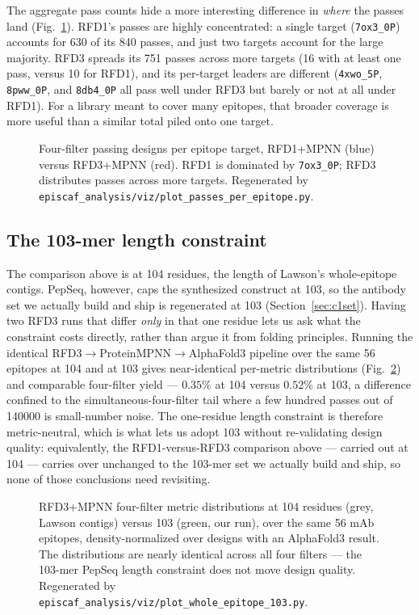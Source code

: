The aggregate pass counts hide a more interesting difference in \emph{where} the passes
land (Fig.~\ref{fig:passep}). RFD1's passes are highly concentrated: a single target
(\texttt{7ox3\_0P}) accounts for \num{630} of its \num{840} passes, and just two targets
account for the large majority. RFD3 spreads its \num{751} passes across more targets (16
with at least one pass, versus 10 for RFD1), and its per-target leaders are different
(\texttt{4xwo\_5P}, \texttt{8pww\_0P}, and \texttt{8db4\_0P} all pass well under RFD3 but
barely or not at all under RFD1). For a library meant to cover many epitopes, that broader
coverage is more useful than a similar total piled onto one target.

\begin{figure}[h]\centering
{}
\caption{Four-filter passing designs per epitope target, RFD1+MPNN (blue) versus RFD3+MPNN
(red). RFD1 is dominated by \texttt{7ox3\_0P}; RFD3 distributes passes across more targets.
Regenerated by \texttt{episcaf\_analysis/viz/plot\_passes\_per\_epitope.py}.}
\label{fig:passep}
\end{figure}

\subsection{The 103-mer length constraint}\label{sec:lenconstraint}
The comparison above is at \num{104} residues, the length of Lawson's whole-epitope contigs. PepSeq,
however, caps the synthesized construct at \num{103}, so the antibody set we actually build and ship is
regenerated at \num{103} (Section~\ref{sec:c1set}). Having two RFD3 runs that differ \emph{only} in that
one residue lets us ask what the constraint costs directly, rather than argue it from folding
principles. Running the identical RFD3$\rightarrow$ProteinMPNN$\rightarrow$AlphaFold3 pipeline over the
same \num{56} epitopes at \num{104} and at \num{103} gives near-identical per-metric distributions
(Fig.~\ref{fig:len}) and comparable four-filter yield --- $0.35\%$ at \num{104} versus $0.52\%$ at
\num{103}, a difference confined to the simultaneous-four-filter tail where a few hundred passes out of
\num{140000} is small-number noise. The one-residue length constraint is therefore metric-neutral, which
is what lets us adopt \num{103} without re-validating design quality: equivalently, the RFD1-versus-RFD3
comparison above --- carried out at \num{104} --- carries over unchanged to the \num{103}-mer set we
actually build and ship, so none of those conclusions need revisiting.

\begin{figure}[h]\centering
{}
\caption{RFD3+MPNN four-filter metric distributions at \num{104} residues (grey, Lawson contigs) versus
\num{103} (green, our run), over the same \num{56} mAb epitopes, density-normalized over designs with an
AlphaFold3 result. The distributions are nearly identical across all four filters --- the \num{103}-mer
PepSeq length constraint does not move design quality. Regenerated by
\texttt{episcaf\_analysis/viz/plot\_whole\_epitope\_103.py}.}
\label{fig:len}
\end{figure}
